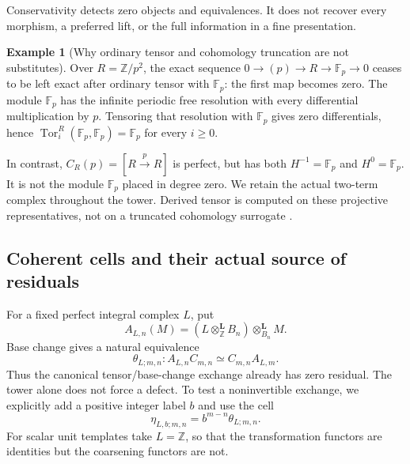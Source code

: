 \documentclass[11pt]{article}
\theoremstyle{definition}
\newtheorem{example}[theorem]{Example}
\theoremstyle{remark}
\begin{document}
Conservativity detects zero objects and equivalences. It does not recover every morphism, a preferred lift, or the full information in a fine presentation.

\begin{example}[Why ordinary tensor and cohomology truncation are not substitutes]\label{ex:derived-not-naive}
Over $R=\mathbb Z/p^2$, the exact sequence $0\to(p)\to R\to\mathbb F_p\to0$ ceases to be left exact after ordinary tensor with $\mathbb F_p$: the first map becomes zero. The module $\mathbb F_p$ has the infinite periodic free resolution with every differential multiplication by $p$. Tensoring that resolution with $\mathbb F_p$ gives zero differentials, hence $\operatorname{Tor}_i^R(\mathbb F_p,\mathbb F_p)=\mathbb F_p$ for every $i\geq0$.

In contrast, $C_R(p)=[R\xrightarrow p R]$ is perfect, but has both $H^{-1}=\mathbb F_p$ and $H^0=\mathbb F_p$. It is not the module $\mathbb F_p$ placed in degree zero. We retain the actual two-term complex throughout the tower. Derived tensor is computed on these projective representatives, not on a truncated cohomology surrogate \cite{StacksDerivedTensor}.
\end{example}

\subsection{Coherent cells and their actual source of residuals}

For a fixed perfect integral complex $L$, put
\[
 A_{L,n}(M)=(L\otimes^{\mathbf L}_{\mathbb Z}B_n)\otimes^{\mathbf L}_{B_n}M.
\]
Base change gives a natural equivalence
\[
 \theta_{L;m,n}:A_{L,n}C_{m,n}\simeq C_{m,n}A_{L,m}.
\]
Thus the canonical tensor/base-change exchange already has zero residual. The tower alone does not force a defect. To test a noninvertible exchange, we explicitly add a positive integer label $b$ and use the cell
\[
 \eta_{L,b;m,n}=b^{m-n}\theta_{L;m,n}.
\]
For scalar unit templates take $L=\mathbb Z$, so that the transformation functors are identities but the coarsening functors are not.
\end{document}
